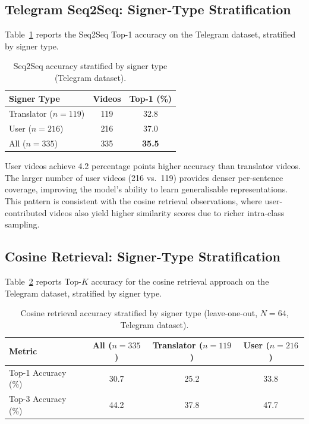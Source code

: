 \documentclass[runningheads]{llncs}
\begin{document}
\subsection{Telegram Seq2Seq: Signer-Type Stratification}\label{sec:telegram_signer}

Table~\ref{tab:telegram_detail} reports the Seq2Seq Top-1 accuracy
on the Telegram dataset, stratified by signer type.

\begin{table}[t]
\centering
\caption{Seq2Seq accuracy stratified by signer type (Telegram dataset).}
\label{tab:telegram_detail}
\begin{tabular}{@{}lcc@{}}
\toprule
Signer Type & Videos & Top-1 (\%) \\
\midrule
Translator ($n{=}119$) & 119 & 32.8 \\
User ($n{=}216$) & 216 & 37.0 \\
\midrule
All ($n{=}335$) & 335 & \textbf{35.5} \\
\bottomrule
\end{tabular}
\end{table}

User videos achieve 4.2 percentage points higher accuracy than
translator videos.
The larger number of user videos (216 vs.\ 119) provides denser
per-sentence coverage, improving the model's ability to learn
generalisable representations.
This pattern is consistent with the cosine retrieval observations,
where user-contributed videos also yield higher similarity scores
due to richer intra-class sampling.

\subsection{Cosine Retrieval: Signer-Type Stratification}\label{sec:signer}

Table~\ref{tab:cosine_detail} reports Top-$K$ accuracy for the
cosine retrieval approach on the Telegram dataset, stratified by
signer type.

\begin{table}[t]
\centering
\caption{Cosine retrieval accuracy stratified by signer type
(leave-one-out, $N=64$, Telegram dataset).}
\label{tab:cosine_detail}
\begin{tabular}{@{}lccc@{}}
\toprule
Metric & All ($n{=}335$) & Translator ($n{=}119$) & User ($n{=}216$) \\
\midrule
Top-1 Accuracy (\%) & 30.7 & 25.2 & 33.8 \\
Top-3 Accuracy (\%) & 44.2 & 37.8 & 47.7 \\
\bottomrule
\end{tabular}
\end{table}
\end{document}
